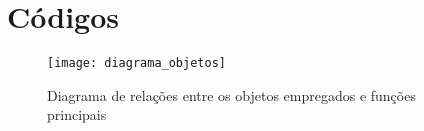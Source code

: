 \chapter{Códigos} \label{Chap:Apendice3}

\begin{figure}[hbt]
	\centering
	\texttt{[image: diagrama\_objetos]}
	\caption{Diagrama de relações entre os objetos empregados e funções principais}
	\label{img_diagrama_objetos}
\end{figure}